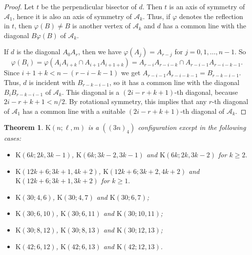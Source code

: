 \documentclass[12pt]{article}
\newtheorem{thm}                   {Theorem} %
\theoremstyle{definition} \newtheorem*{definition}              {Definition}
\theoremstyle{definition} \newtheorem {remark}                   {Remark}
\theoremstyle{definition} \newtheorem*{problem}                {Problem}
\theoremstyle{definition} \newtheorem{example}     [thm]{Example}
\begin{document}
\begin{proof}
Let $t$ be the perpendicular bisector of $d$. Then $t$ is an axis of symmetry of $\mathcal{A}_1 $, 
hence it is also an axis of symmetry of $\mathcal{A}_k $. Thus, if $\varphi$ denotes the reflection 
in $t$, then $\varphi (B)\neq B$ is another vertex of $\mathcal{A}_k $ and $d$ has a common line 
with the diagonal  $B\varphi (B)$ of $\mathcal{A}_k $.

If $d$ is the diagonal $A_0A_{r}$, then we have $\varphi (A_j)=A_{r-j}$ 
for $j=0,1,\dots ,n-1.$ So 
$$\varphi (B_i)=\varphi (A_{i}A_{i+k}\cap A_{i+1}A_{i+1+k}) =A_{r-i}A_{r-i-k}
\cap A_{r-i-1}A_{r-i-k-1}.$$ 
Since $i+1+k< n-(r-i-k-1)$ we get $A_{r-i-1}A_{r-i-k-1}=B_{r-k-i-1}$. 
Thus, $d$ is incident with $B_{r-k-i-1}$, so it has a common  line with the diagonal 
$B_iB_{r-k-i-1}$ of $\mathcal{A}_k $. This diagonal is a $(2i-r+k+1)$-th diagonal, 
because $2i-r+k+1<n/2.$ By rotational symmetry, this implies that any
$r$-th diagonal of $\mathcal{A}_1 $
has a common line with a suitable $(2i-r+k+1)$-th diagonal of $\mathcal{A}_k $. 
\end{proof}

\begin{thm}
\label{thm:extra-inc}
$\mathrm{K}(n;\ell,m)$ is a $((3n)_4)$ configuration except in the following cases:

\begin{itemize}
\item
$\mathrm{K}(6k; 2k,3k-1)$, $\mathrm{K}(6k;3k-2,3k-1)$ and $\mathrm{K}(6k;2k,3k-2)$  for $k\geq 2.$ 
\item
$\mathrm{K}(12k+6; 3k+1,4k+2)$, $\mathrm{K}(12k+6;3k+2,4k+2)$ and $\mathrm{K}(12k+6;3k+1,3k+2)$ for $k\geq 1.$ 
\item
$\mathrm{K}(30;4,6)$, $\mathrm{K}(30;4,7)$ and $\mathrm{K}(30;6,7)$;
\item
$\mathrm{K}(30;6,10)$, $\mathrm{K}(30;6,11)$ and $\mathrm{K}(30;10,11)$;
\item
$\mathrm{K}(30;8,12)$, $\mathrm{K}(30;8,13)$ and $\mathrm{K}(30;12,13)$;
\item
$\mathrm{K}(42;6,12)$, $\mathrm{K}(42;6,13)$ and $\mathrm{K}(42;12,13)$.
\end{itemize}
\end{thm}
\end{document}
